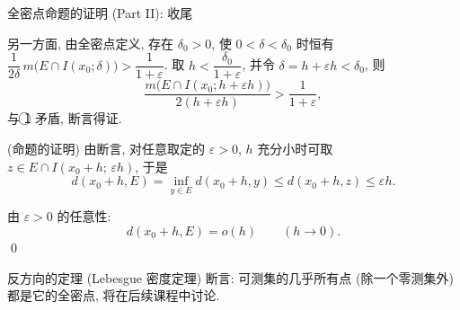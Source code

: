 
\begin{frame}{全密点命题的证明 (Part II): 收尾}

另一方面, 由全密点定义, 存在 $\delta_0 > 0$, 使 $0 < \delta < \delta_0$ 时恒有
$\dfrac{1}{2\delta}\, m\big(E \cap I(x_0; \delta)\big) > \dfrac{1}{1 + \varepsilon}$.
取 $h < \dfrac{\delta_0}{1 + \varepsilon}$, 并令 $\delta = h + \varepsilon h < \delta_0$, 则
\[
\frac{m\big(E \cap I(x_0; h + \varepsilon h)\big)}{2(h + \varepsilon h)} > \frac{1}{1 + \varepsilon},
\]
与 \textcircled{1} 矛盾, 断言得证.

\pause

\startproof[bg=yellow, fg=red](命题的证明)
由断言, 对任意取定的 $\varepsilon > 0$, $h$ 充分小时可取
$z \in E \cap I(x_0 + h;\, \varepsilon h)$, 于是
\[
d(x_0 + h, E) = \inf_{y \in E} d(x_0 + h, y)
\leqslant d(x_0 + h, z) \leqslant \varepsilon h .
\]

\pause

由 $\varepsilon > 0$ 的任意性:
\[
d(x_0 + h, E) = o(h) \qquad (h \to 0).
\]
\qed

\pause

\begin{remark}
反方向的定理 (\alert{Lebesgue 密度定理}) 断言: 可测集的\alert{几乎所有}点 (除一个零测集外) 都是它的全密点, 将在后续课程中讨论.
\end{remark}

\end{frame}




